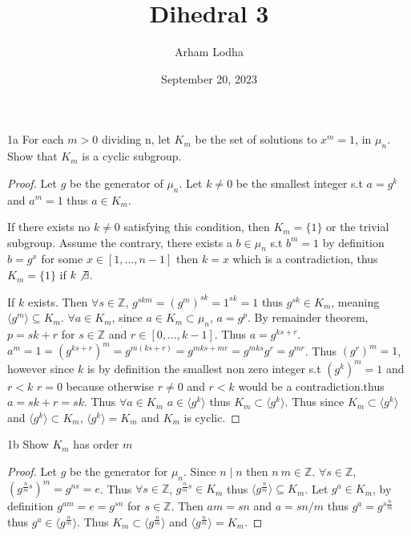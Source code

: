 \documentclass{article}
\newcommand{\Z}{\mathbb{Z}}
\newcommand{\angles}[1]{\langle{#1}\rangle}
\begin{document}
\title{Dihedral 3}
\author{Arham Lodha}%
\date{September 20, 2023}%
\maketitle

\begin{claim}{1a}
    For each $m >0$ dividing n, let $K_m$ be the set of solutions to $x^m =1$, in $\mu_n$. Show that $K_m$ is a cyclic subgroup. 
\end{claim}
\begin{proof}
    Let $g$ be the generator of $\mu_n$. 
    Let $k \neq 0$ be the smallest integer s.t $a = g^k$ and $a^m = 1$ thus $a \in K_m$. 
    
    
    If there exists no $k \neq 0$ satisfying this condition, then $K_m = \{1\}$ or the trivial subgroup. Assume the contrary, there exists a $b \in \mu_n$ s.t $b^m = 1$ by definition $b = g^x$ for some $x \in [1, \ldots, n - 1]$ then $k = x$ which is a contradiction, thus $K_m = \{1\}$ if $k \not \exists$.

    If $k$ exists. Then $\forall s \in \Z$, $g^{skm} = (g^{m})^{sk} = 1^{sk} = 1$ thus $g^{sk} \in K_m$, meaning $\angles{g^m} \subseteq K_m$. $\forall a \in K_m$, since $a \in K_m \subset \mu_n$, $a = g^{p}$. By remainder theorem, $p = sk + r$ for $s \in \Z$ and $r \in [0, \ldots, k - 1]$. Thus $a = g^{ks + r}$. $a^m = 1 = (g^{ks+r})^m = g^{m(ks + r)} = g^{mks + mr} = g^{mks}g^r = g^{mr}$. Thus $(g^r)^m = 1$, however since $k$ is by definition the smallest non zero integer s.t $(g^k)^m = 1$ and $r < k$ $r = 0$ because otherwise $r \neq 0$ and $r < k$ would be a contradiction.thus $a = sk + r = sk$. Thus $\forall a \in K_m$ $a \in \angles{g^k}$ thus $K_m \subset \angles{g^k}$. Thus since $K_m \subset \angles{g^k}$ and $\angles{g^k} \subset K_m$, $\angles{g^k} = K_m$ and $K_m$ is cyclic.
\end{proof}

\begin{claim}{1b}
    Show $K_m$ has order $m$
\end{claim}
\begin{proof}
    Let $g$ be the generator for $\mu_n$. Since $n \mid n $ then $n \ m \in \Z$. $\forall s\in \Z$, $(g^{\frac{n}{m}s})^m = g^{ns} = e$. Thus $\forall s \in \Z$, $g^{\frac{n}{m}s} \in K_m$ thus $\angles{g^{\frac{n}{m}}} \subseteq K_m$. Let $g^a \in K_m$, by definition $g^{am} = e = g^{sn}$ for $s \in \Z$. Then $am = sn$ and $a = sn/m$ thus $g^a = g^{s\frac{n}{m}}$ thus $g^a \in \angles{g^{\frac{n}{m}}}$. Thus $K_m \subset \angles{g^{\frac{n}{m}}}$ and $\angles{g^{\frac{n}{m}}} = K_m$.
\end{proof}
\end{document}
